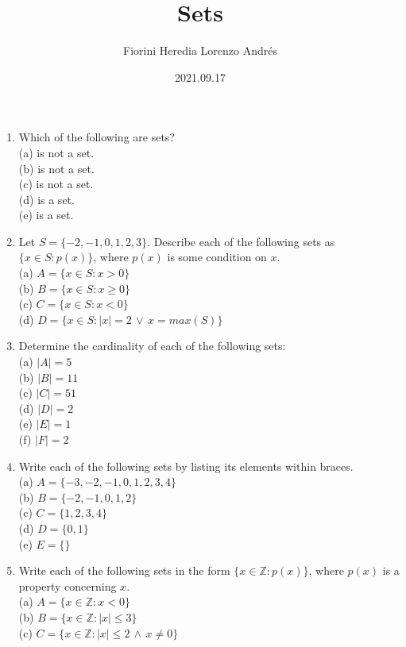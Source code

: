 \documentclass[11pt]{article}
\author{Fiorini Heredia Lorenzo Andrés}
\title{Sets}
\date{2021.09.17}
\begin{document}

\begin{enumerate}

\item Which of the following are sets? \\ 
{
	(a) is not a set. \\
	(b) is not a set. \\
	(c) is not a set. \\
	(d) is a set. \\
	(e) is a set.
}

\item Let $S = \{-2, -1, 0, 1, 2, 3\}$. Describe each of the following sets as $\{x \in S : p(x)\}$, where $p(x)$ is some
condition on $x$.\\ 
{
	(a) $A = \{ x \in S : x > 0 \}$\\
	(b) $B = \{ x \in S : x \geq 0\}$\\
	(c) $C = \{ x \in S : x < 0\}$\\
	(d) $D = \{ x \in S : |x| = 2 \hspace{2pt}\lor\hspace{2pt}  x = max(S)\}$\\
}

\item  Determine the cardinality of each of the following sets: \\
{
	(a) $|A| = 5$\\
	(b) $|B| = 11$\\
	(c) $|C| = 51$\\
	(d) $|D| = 2$\\
	(e) $|E| = 1$\\
	(f) $|F| = 2$\\
}

\item Write each of the following sets by listing its elements within braces.\\
{
	(a) $A = \{-3, -2, -1, 0, 1, 2, 3, 4 \} $\\
	(b) $B = \{-2, -1, 0, 1, 2 \} $\\
	(c) $C = \{ 1, 2, 3, 4 \} $\\
	(d) $D = \{ 0, 1 \} $\\
	(e) $E = \{  \} $\\
}


\item Write each of the following sets in the form $\{x \in \mathbb{Z} : p(x)\}$, where $p(x)$ is a property concerning $x$.\\ 
{
	(a) $A = \{ x \in \mathbb{Z} : x < 0 \}$\\
	(b) $B = \{ x \in \mathbb{Z} :  |x| \leq 3\}$\\
	(c) $C = \{ x \in \mathbb{Z} :  |x| \leq 2 \hspace{2pt}\land\hspace{2pt} x \neq 0\}$\\
}




\end{enumerate}
\end{document}
